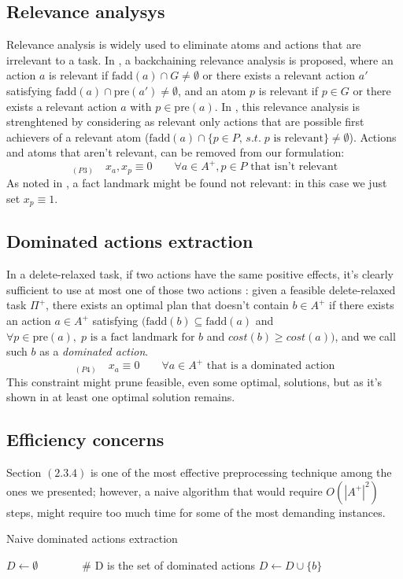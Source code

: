 \subsection{Relevance analysys}
Relevance analysis is widely used to eliminate atoms and actions that are irrelevant to a task. In \cite{Imai_15}, a backchaining relevance analysis is proposed, where an action $a$ is relevant if $\mbox{fadd}(a)\cap G\not=\emptyset$ or there exists a relevant action $a'$ satisfying $\mbox{fadd}(a)\cap \mbox{pre}(a')\not=\emptyset$, and an atom $p$ is relevant if $p\in G$ or there exists a relevant action $a$ with $p\in \mbox{pre}(a)$.
In \cite{MLM_Haslum_12}, this relevance analysis is strenghtened by considering as relevant only actions that are possible first achievers of a relevant atom ($\mbox{fadd}(a)\cap\{p\in P,\,s.t.\;p\mbox{ is relevant}\}\not=\emptyset$).
Actions and atoms that aren't relevant, can be removed from our formulation:
$$_{(P3)}\quad x_a,x_p\equiv0\qquad\forall a\in A^+,p\in P\mbox{ that isn't relevant}$$
As noted in \cite{Imai_15}, a fact landmark might be found not relevant: in this case we just set $x_p\equiv1$.

\subsection{Dominated actions extraction}
In a delete-relaxed task, if two actions have the same positive effects, it's clearly sufficient to use at most one of those two actions \cite{Imai_15}: given a feasible delete-relaxed task $\Pi^+$, there exists an optimal plan that doesn't contain $b\in A^+$ if there exists an action $a\in A^+$ satisfying $(\mbox{fadd}(b)\subseteq \mbox{fadd}(a)$ and $\forall p\in \mbox{pre}(a),\;p\mbox{ is a fact landmark for }b$ and $cost(b)\geq cost(a))$, and we call such $b$ as a \textit{dominated action}.
$$_{(P4)}\quad x_a\equiv0\qquad\forall a\in A^+\mbox{ that is a dominated action}$$
This constraint might prune feasible, even some optimal, solutions, but as it's shown in \cite{Imai_15} at least one optimal solution remains. 

\subsection{Efficiency concerns}
Section $(2.3.4)$ is one of the most effective preprocessing technique among the ones we presented; however, a naive algorithm that would require $O(|A^+|^2)$ steps, might require too much time for some of the most demanding instances.
\begin{algorithm}[h]
    \caption{Naive dominated actions extraction}
    \begin{algorithmic}
        \State $D\gets\emptyset\qquad\qquad$\# D is the set of dominated actions
                    \State $D\gets D\cup\{b\}$
                \EndIf
            \EndFor
        \EndFor
    \end{algorithmic}
\end{algorithm}

